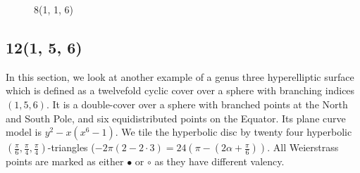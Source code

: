 \documentclass[12pt,reqno]{amsart}
\DeclareMathOperator{\Aut}{Aut}
\theoremstyle{definition}
\theoremstyle{remark}
\begin{document}
\begin{figure}[htbp]
    \centering
    \qquad
    \caption{8(1, 1, 6)}%
    \label{fig:116}%
\end{figure}



\subsection{12(1, 5, 6)}

In this section, we look at another example of a genus three hyperelliptic surface which is defined as a twelvefold cyclic cover over a sphere with branching indices $(1, 5, 6).$ It is a double-cover over a sphere with branched points at the North and South Pole, and six equidistributed points on the Equator. Its plane curve model is $y^2 - x (x^6 - 1).$ We tile the hyperbolic disc by twenty four hyperbolic $(\frac{\pi}{6}, \frac{\pi}{4}, \frac{\pi}{4})$-triangles ($-2 \pi (2 - 2 \cdot 3) = 24 (\pi - (2 \alpha + \frac{\pi}{6})).$ All Weierstrass points are marked as either $\bullet$ or $\circ$ as they have different valency.
\end{document}
